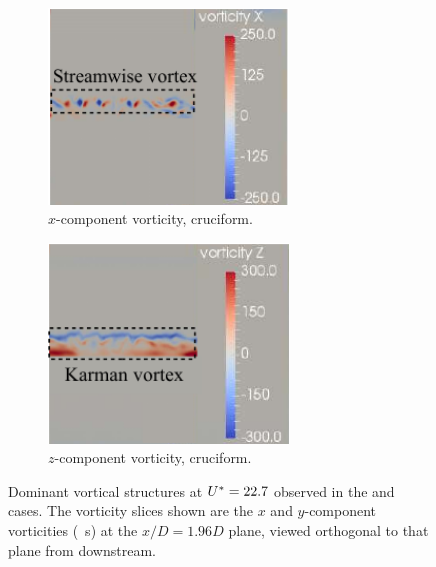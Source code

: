 \documentclass[oneside]{utmthesis}
\begin{document}
\begin{figure}
  \begin{subfigure}[h]{0.4\textwidth}
    \centering
    \includegraphics[width=0.7\textwidth]{figs/vorx00}
    \caption{$x$-component vorticity, \angth{} cruciform.}
    \label{fig:vorx00}
  \end{subfigure}
  \begin{subfigure}[h]{0.4\textwidth}
    \centering
    \includegraphics[width=0.7\textwidth]{figs/vorz00}
    \caption{$z$-component vorticity, \angth{} cruciform.}
    \label{fig:vorz00}
  \end{subfigure}

  \caption{Dominant vortical structures at $U^{*} = 22.7$ observed in the \angtw{} and \angon{} cases. The vorticity slices shown are the $x$ and $y$-component vorticities (\si{\per\second}) at the $x/D = 1.96D$ plane, viewed orthogonal to that plane from downstream.} \label{fig:vortStruct22500}
\end{figure}
\end{document}
